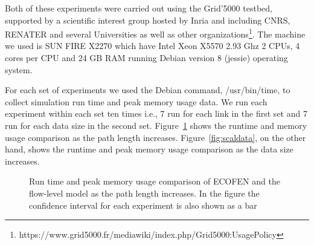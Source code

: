 Both of these experiments were carried out using the Grid'5000 testbed, supported by a scientific interest group hosted by Inria and including CNRS, RENATER and several Universities as well as other organizations\footnote{https://www.grid5000.fr/mediawiki/index.php/Grid5000:UsagePolicy}. The machine we used is SUN FIRE X2270 which have Intel Xeon X5570 2.93 Ghz 2 CPUs, 4 cores per CPU and 24 GB RAM running Debian version 8 (jessie) operating system.

For each set of experiments we used the Debian command, /usr/bin/time, to collect simulation run time and peak memory usage data. We run each experiment within each set ten times i.e., 7 run for each link in the first set and 7 run for each data size in the second set. Figure~\ref{fig:scallinks} shows the runtime and memory usage comparison as the path length increases. Figure~\ref{fig:scaldata}, on the other hand, shows the runtime and peak memory usage comparison as the data size increases.

\begin{figure}[ht]
	\centering
	\centering
	\caption{Run time and peak memory usage comparison of ECOFEN and the flow-level model as the path length increases. In the figure the confidence interval for each experiment is also shown as a bar}
	\label{fig:scallinks}
\end{figure}


